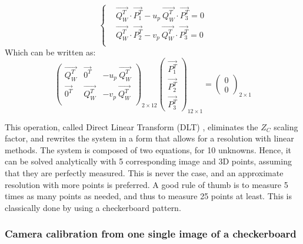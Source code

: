   \begin{equation}
    \begin{cases}
      & \overrightarrow{Q_W^T} \cdot \overrightarrow{P_1^T} - u_p \ \overrightarrow{Q_W^T} \cdot \overrightarrow{P_3^T} = 0\\
      & \overrightarrow{Q_W^T} \cdot \overrightarrow{P_2^T} - v_p \ \overrightarrow{Q_W^T} \cdot \overrightarrow{P_3^T} = 0\\
    \end{cases}
  \end{equation}
  Which can be written as:
  \begin{equation}\label{eq:calib}
    \boxed{
      \begin{pmatrix}
        \overrightarrow{Q_W^T} & \overrightarrow{0^T} & - u_p \ \overrightarrow{Q_W^T}\\   
        \overrightarrow{0^T} & \overrightarrow{Q_W^T} & - v_p \ \overrightarrow{Q_W^T} \\ 
      \end{pmatrix}_{\!\!2\times 12}
      \begin{pmatrix} \overrightarrow{P_1^T} \\ \overrightarrow{P_2^T} \\ \overrightarrow{P_3^T} \end{pmatrix}_{\!\!12\times 1}
      = \begin{pmatrix} 0 \\ 0 \end{pmatrix}_{\!\!2\times 1}
    }
  \end{equation}

This operation, called Direct Linear Transform (DLT) \cite{Sutherland1974}, eliminates the $Z_C$ scaling factor, and rewrites the system in a form that allows for a resolution with linear methods. The system is composed of two equations, for 10 unknowns. Hence, it can be solved analytically with 5 corresponding image and 3D points, assuming that they are perfectly measured. This is never the case, and an approximate resolution with more points is preferred. A good rule of thumb is to measure 5 times as many points as needed, and thus to measure 25 points at least. This is classically done by using a checkerboard pattern. 

\newpage
\subsubsection{Camera calibration from one single image of a checkerboard}

